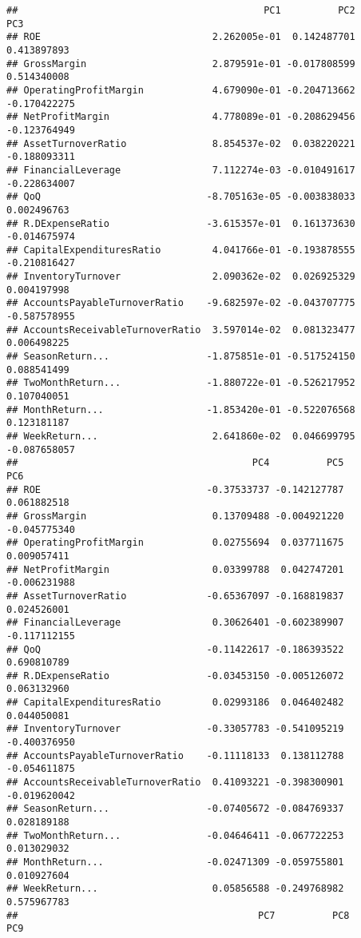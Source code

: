 \documentclass[
]{article}
\begin{document}
\begin{verbatim}
##                                           PC1          PC2          PC3
## ROE                              2.262005e-01  0.142487701  0.413897893
## GrossMargin                      2.879591e-01 -0.017808599  0.514340008
## OperatingProfitMargin            4.679090e-01 -0.204713662 -0.170422275
## NetProfitMargin                  4.778089e-01 -0.208629456 -0.123764949
## AssetTurnoverRatio               8.854537e-02  0.038220221 -0.188093311
## FinancialLeverage                7.112274e-03 -0.010491617 -0.228634007
## QoQ                             -8.705163e-05 -0.003838033  0.002496763
## R.DExpenseRatio                 -3.615357e-01  0.161373630 -0.014675974
## CapitalExpendituresRatio         4.041766e-01 -0.193878555 -0.210816427
## InventoryTurnover                2.090362e-02  0.026925329  0.004197998
## AccountsPayableTurnoverRatio    -9.682597e-02 -0.043707775 -0.587578955
## AccountsReceivableTurnoverRatio  3.597014e-02  0.081323477  0.006498225
## SeasonReturn...                 -1.875851e-01 -0.517524150  0.088541499
## TwoMonthReturn...               -1.880722e-01 -0.526217952  0.107040051
## MonthReturn...                  -1.853420e-01 -0.522076568  0.123181187
## WeekReturn...                    2.641860e-02  0.046699795 -0.087658057
##                                         PC4          PC5          PC6
## ROE                             -0.37533737 -0.142127787  0.061882518
## GrossMargin                      0.13709488 -0.004921220 -0.045775340
## OperatingProfitMargin            0.02755694  0.037711675  0.009057411
## NetProfitMargin                  0.03399788  0.042747201 -0.006231988
## AssetTurnoverRatio              -0.65367097 -0.168819837  0.024526001
## FinancialLeverage                0.30626401 -0.602389907 -0.117112155
## QoQ                             -0.11422617 -0.186393522  0.690810789
## R.DExpenseRatio                 -0.03453150 -0.005126072  0.063132960
## CapitalExpendituresRatio         0.02993186  0.046402482  0.044050081
## InventoryTurnover               -0.33057783 -0.541095219 -0.400376950
## AccountsPayableTurnoverRatio    -0.11118133  0.138112788 -0.054611875
## AccountsReceivableTurnoverRatio  0.41093221 -0.398300901 -0.019620042
## SeasonReturn...                 -0.07405672 -0.084769337  0.028189188
## TwoMonthReturn...               -0.04646411 -0.067722253  0.013029032
## MonthReturn...                  -0.02471309 -0.059755801  0.010927604
## WeekReturn...                    0.05856588 -0.249768982  0.575967783
##                                          PC7          PC8         PC9

\end{verbatim}
\end{document}
